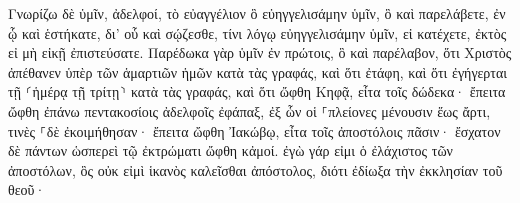 \documentclass{openreader}
\begin{document}
Γνωρίζω δὲ ὑμῖν, ἀδελφοί, τὸ εὐαγγέλιον ὃ εὐηγγελισάμην ὑμῖν, ὃ καὶ παρελάβετε, ἐν ᾧ καὶ ἑστήκατε, 
δι’ οὗ καὶ σῴζεσθε, τίνι λόγῳ εὐηγγελισάμην ὑμῖν, εἰ κατέχετε, ἐκτὸς εἰ μὴ εἰκῇ ἐπιστεύσατε. 
Παρέδωκα γὰρ ὑμῖν ἐν πρώτοις, ὃ καὶ παρέλαβον, ὅτι Χριστὸς ἀπέθανεν ὑπὲρ τῶν ἁμαρτιῶν ἡμῶν κατὰ τὰς γραφάς, 
καὶ ὅτι ἐτάφη, καὶ ὅτι ἐγήγερται τῇ ⸂ἡμέρᾳ τῇ τρίτῃ⸃ κατὰ τὰς γραφάς, 
καὶ ὅτι ὤφθη Κηφᾷ, εἶτα τοῖς δώδεκα· 
ἔπειτα ὤφθη ἐπάνω πεντακοσίοις ἀδελφοῖς ἐφάπαξ, ἐξ ὧν οἱ ⸀πλείονες μένουσιν ἕως ἄρτι, τινὲς ⸀δὲ ἐκοιμήθησαν· 
ἔπειτα ὤφθη Ἰακώβῳ, εἶτα τοῖς ἀποστόλοις πᾶσιν· 
ἔσχατον δὲ πάντων ὡσπερεὶ τῷ ἐκτρώματι ὤφθη κἀμοί. 
ἐγὼ γάρ εἰμι ὁ ἐλάχιστος τῶν ἀποστόλων, ὃς οὐκ εἰμὶ ἱκανὸς καλεῖσθαι ἀπόστολος, διότι ἐδίωξα τὴν ἐκκλησίαν τοῦ θεοῦ· 
\end{document}
